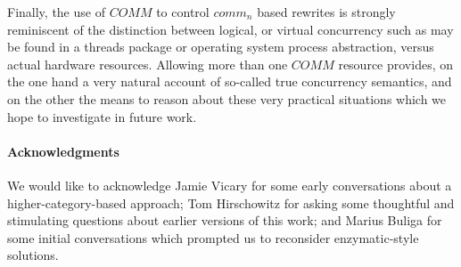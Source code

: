 \documentclass[]{acm_proc_article-sp}
\numberwithin{equation}{subsection}
\begin{document}
Finally, the use of $COMM$ to control $comm_n$ based rewrites is
strongly reminiscent of the distinction between logical, or virtual
concurrency such as may be found in a threads package or operating
system process abstraction, versus actual hardware resources. Allowing
more than one $COMM$ resource provides, on the one hand a very natural
account of so-called true concurrency semantics, and on the other the
means to reason about these very practical situations which we hope to
investigate in future work.

\paragraph{Acknowledgments}
We would like to acknowledge Jamie Vicary for some early conversations
about a higher-category-based approach; Tom Hirschowitz for asking
some thoughtful and stimulating questions about earlier versions of
this work; and Marius Buliga for some initial conversations which
prompted us to reconsider enzymatic-style solutions.







\end{document}
